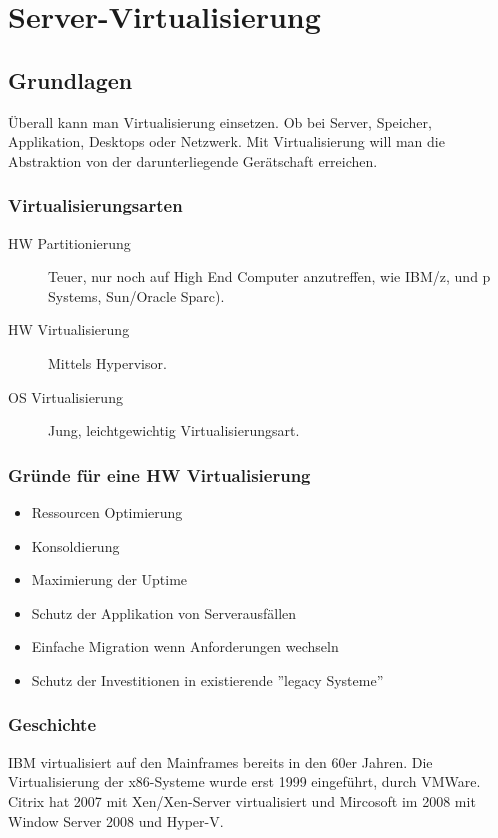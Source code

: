 \chapter{Server-Virtualisierung}

\section{Grundlagen}
Überall kann man Virtualisierung einsetzen. Ob bei Server, Speicher, Applikation, Desktops oder Netzwerk. Mit Virtualisierung will man die Abstraktion von der darunterliegende Gerätschaft erreichen.

\subsection{Virtualisierungsarten}
\label{sec:virtualisierungsarten}
\begin{description}
	\item[HW Partitionierung] Teuer, nur noch auf High End Computer anzutreffen, wie IBM/z, und p Systems, Sun/Oracle Sparc).
	\item[HW Virtualisierung] Mittels Hypervisor.
	\item[OS Virtualisierung] Jung, leichtgewichtig Virtualisierungsart. 
\end{description}

\subsection{Gründe für eine HW Virtualisierung}
\label{sec:gruende-hw-virtualisierung}
\begin{itemize}
	\item Ressourcen Optimierung
	\item Konsoldierung
	\item Maximierung der Uptime
	\item Schutz der Applikation von Serverausfällen
	\item Einfache Migration wenn Anforderungen wechseln
	\item Schutz der Investitionen in existierende ''legacy Systeme'' 
\end{itemize}

\subsection{Geschichte}
IBM virtualisiert auf den Mainframes bereits in den 60er Jahren. Die Virtualisierung der x86-Systeme wurde erst 1999 eingeführt, durch VMWare. Citrix hat 2007 mit Xen/Xen-Server virtualisiert und Mircosoft im 2008 mit Window Server 2008 und Hyper-V.

